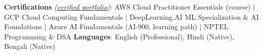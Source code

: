\documentclass[9.5pt]{article}
\begin{document}
\textbf{Certifications} \textit{(\href{https://drive.google.com/drive/folders/1ZQd-DeX-rXlEVDTwDJfjLjnG7iPc_fEw}{verified portfolio})}: AWS Cloud Practitioner Essentials (course) $|$ GCP Cloud Computing Fundamentals $|$ DeepLearning.AI ML Specialization \& AI Foundations $|$ Azure AI Fundamentals (AI-900, learning path) $|$ NPTEL Programming \& DSA \quad\textbullet\quad \textbf{Languages}: English (Professional), Hindi (Native), Bengali (Native)
\end{document}
